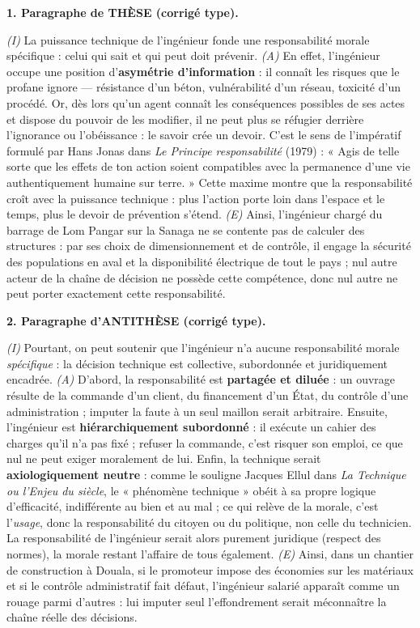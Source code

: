 \documentclass[11pt]{article}
\begin{document}
\begin{corrige}
\textbf{1. Paragraphe de THÈSE (corrigé type).}\par
\emph{(I)} La puissance technique de l'ingénieur fonde une responsabilité morale spécifique : celui qui sait et qui peut doit prévenir. \emph{(A)} En effet, l'ingénieur occupe une position d'\textbf{asymétrie d'information} : il connaît les risques que le profane ignore — résistance d'un béton, vulnérabilité d'un réseau, toxicité d'un procédé. Or, dès lors qu'un agent connaît les conséquences possibles de ses actes et dispose du pouvoir de les modifier, il ne peut plus se réfugier derrière l'ignorance ou l'obéissance : le savoir crée un devoir. C'est le sens de l'impératif formulé par Hans Jonas dans \emph{Le Principe responsabilité} (1979) : « Agis de telle sorte que les effets de ton action soient compatibles avec la permanence d'une vie authentiquement humaine sur terre. » Cette maxime montre que la responsabilité croît avec la puissance technique : plus l'action porte loin dans l'espace et le temps, plus le devoir de prévention s'étend. \emph{(E)} Ainsi, l'ingénieur chargé du barrage de Lom Pangar sur la Sanaga ne se contente pas de calculer des structures : par ses choix de dimensionnement et de contrôle, il engage la sécurité des populations en aval et la disponibilité électrique de tout le pays ; nul autre acteur de la chaîne de décision ne possède cette compétence, donc nul autre ne peut porter exactement cette responsabilité.\par
\textbf{2. Paragraphe d'ANTITHÈSE (corrigé type).}\par
\emph{(I)} Pourtant, on peut soutenir que l'ingénieur n'a aucune responsabilité morale \emph{spécifique} : la décision technique est collective, subordonnée et juridiquement encadrée. \emph{(A)} D'abord, la responsabilité est \textbf{partagée et diluée} : un ouvrage résulte de la commande d'un client, du financement d'un État, du contrôle d'une administration ; imputer la faute à un seul maillon serait arbitraire. Ensuite, l'ingénieur est \textbf{hiérarchiquement subordonné} : il exécute un cahier des charges qu'il n'a pas fixé ; refuser la commande, c'est risquer son emploi, ce que nul ne peut exiger moralement de lui. Enfin, la technique serait \textbf{axiologiquement neutre} : comme le souligne Jacques Ellul dans \emph{La Technique ou l'Enjeu du siècle}, le « phénomène technique » obéit à sa propre logique d'efficacité, indifférente au bien et au mal ; ce qui relève de la morale, c'est l'\emph{usage}, donc la responsabilité du citoyen ou du politique, non celle du technicien. La responsabilité de l'ingénieur serait alors purement juridique (respect des normes), la morale restant l'affaire de tous également. \emph{(E)} Ainsi, dans un chantier de construction à Douala, si le promoteur impose des économies sur les matériaux et si le contrôle administratif fait défaut, l'ingénieur salarié apparaît comme un rouage parmi d'autres : lui imputer seul l'effondrement serait méconnaître la chaîne réelle des décisions.\par

\end{corrige}
\end{document}

